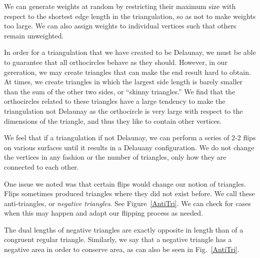 \documentclass[12pt]{article}
\begin{document}
\noindent We can generate weights at random by restricting their maximum size with respect to the shortest edge length in the triangulation, so as not to make weights too large. We can also assign weights to individual vertices such that others remain unweighted. \newline

\noindent In order for a triangulation that we have created to be Delaunay, we must be able to guarantee that all orthocircles behave as they should. However, in our gereration, we may create triangles that can make the end result hard to obtain. At times, we create triangles in which the largest side length is barely smaller than the sum of the other two sides, or ``skinny triangles.'' We find that the orthocircles related to these triangles have a large tendency to make the triangulation not Delaunay as the orthocircle is very large with respect to the dimensions of the triangle, and thus they like to contain other vertices. \newline

\noindent We feel that if a triangulation if not Delaunay, we can perform a series of 2-2 flips on various surfaces until it results in a Delauany configuration. We do not change the vertices in any fashion or the number of triangles, only how they are connected to each other. \newline

\noindent One issue we noted was that certain flips would change our notion of triangles. Flips sometimes produced triangles where they did not exist before. We call these anti-triangles, or \textit{negative triangles}. See Figure~\ref{AntiTri}. We can check for cases when this may happen and adapt our flipping process as needed. \newline

\noindent The dual lengths of negative triangles are exactly opposite in length than of a congruent regular triangle. Similarly, we say that a negative triangle has a negative area in order to conserve area, as can also be seen in Fig.~\ref{AntiTri}. \newline
\end{document}
